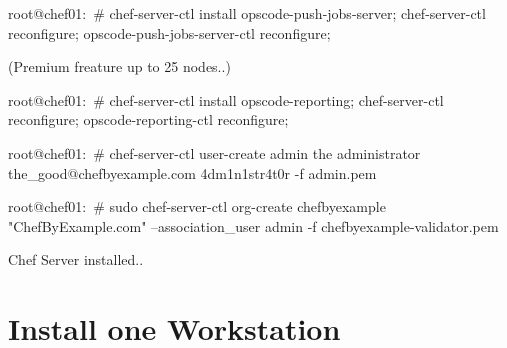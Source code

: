 \begin{codelisting}
\label{code:}
\codecaption{}
\begin{code}
root@chef01:~# chef-server-ctl install opscode-push-jobs-server; chef-server-ctl reconfigure; opscode-push-jobs-server-ctl reconfigure;
\end{code}
\end{codelisting}


(Premium freature up to 25 nodes..)
\begin{codelisting}
\label{code:}
\codecaption{}
\begin{code}
root@chef01:~# chef-server-ctl install opscode-reporting; chef-server-ctl reconfigure; opscode-reporting-ctl reconfigure; 
\end{code}
\end{codelisting}


\begin{codelisting}
\label{code:}
\codecaption{}
\begin{code}
root@chef01:~# chef-server-ctl user-create admin the administrator the_good@chefbyexample.com 4dm1n1str4t0r -f admin.pem
\end{code}
\end{codelisting}


\begin{codelisting}
\label{code:}
\codecaption{}
\begin{code}
root@chef01:~# sudo chef-server-ctl org-create chefbyexample "ChefByExample.com" --association_user admin -f chefbyexample-validator.pem
\end{code}
\end{codelisting}


Chef Server installed..

\section{Install one Workstation}

